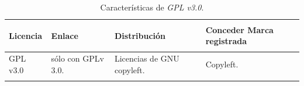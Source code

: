 \begin{longtable}[]{@{}llll@{}} 
\toprule \label{gnuresumetable}
\begin{minipage}[b]{0.11\columnwidth}\raggedright\strut
Licencia\strut
\end{minipage} & \begin{minipage}[b]{0.15\columnwidth}\raggedright\strut
Enlace\strut
\end{minipage} & \begin{minipage}[b]{0.20\columnwidth}\raggedright\strut
Distribución\strut
\end{minipage} & \begin{minipage}[b]{0.40\columnwidth}\raggedright\strut
Conceder Marca registrada\strut
\end{minipage}\tabularnewline
\midrule
\endhead
\begin{minipage}[t]{0.15\columnwidth}\raggedright\strut
GPL v3.0\strut
\end{minipage} & \begin{minipage}[t]{0.15\columnwidth}\raggedright\strut
sólo con GPLv 3.0.\strut
\end{minipage} & \begin{minipage}[t]{0.20\columnwidth}\raggedright\strut
Licencias de GNU copyleft.\strut
\end{minipage} & \begin{minipage}[t]{0.40\columnwidth}\raggedright\strut
Copyleft.\strut
\end{minipage}\tabularnewline
\bottomrule
\caption{Características de \textit{GPL v3.0}.}
\end{longtable}


